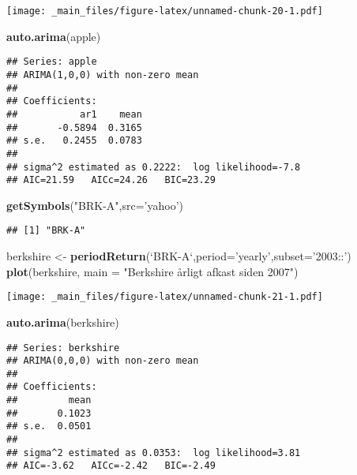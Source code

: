 \documentclass[]{book}
\newenvironment{Shaded}{\begin{snugshade}}{\end{snugshade}}
\newcommand{\DataTypeTok}[1]{\textcolor[rgb]{0.13,0.29,0.53}{#1}}
\newcommand{\KeywordTok}[1]{\textcolor[rgb]{0.13,0.29,0.53}{\textbf{#1}}}
\newcommand{\NormalTok}[1]{#1}
\newcommand{\StringTok}[1]{\textcolor[rgb]{0.31,0.60,0.02}{#1}}
\begin{document}
\texttt{[image: \_main\_files/figure-latex/unnamed-chunk-20-1.pdf]}

\begin{Shaded}
\begin{Highlighting}[]
\KeywordTok{auto.arima}\NormalTok{(apple)}
\end{Highlighting}
\end{Shaded}

\begin{verbatim}
## Series: apple 
## ARIMA(1,0,0) with non-zero mean 
## 
## Coefficients:
##           ar1    mean
##       -0.5894  0.3165
## s.e.   0.2455  0.0783
## 
## sigma^2 estimated as 0.2222:  log likelihood=-7.8
## AIC=21.59   AICc=24.26   BIC=23.29
\end{verbatim}

\begin{Shaded}
\begin{Highlighting}[]
\KeywordTok{getSymbols}\NormalTok{(}\StringTok{"BRK-A"}\NormalTok{,}\DataTypeTok{src=}\StringTok{'yahoo'}\NormalTok{)}
\end{Highlighting}
\end{Shaded}

\begin{verbatim}
## [1] "BRK-A"
\end{verbatim}

\begin{Shaded}
\begin{Highlighting}[]
\NormalTok{berkshire <-}\StringTok{ }\KeywordTok{periodReturn}\NormalTok{(}\StringTok{`}\DataTypeTok{BRK-A}\StringTok{`}\NormalTok{,}\DataTypeTok{period=}\StringTok{'yearly'}\NormalTok{,}\DataTypeTok{subset=}\StringTok{'2003::'}\NormalTok{)}
\KeywordTok{plot}\NormalTok{(berkshire, }\DataTypeTok{main =} \StringTok{"Berkshire årligt afkast siden 2007"}\NormalTok{)}
\end{Highlighting}
\end{Shaded}

\texttt{[image: \_main\_files/figure-latex/unnamed-chunk-21-1.pdf]}

\begin{Shaded}
\begin{Highlighting}[]
\KeywordTok{auto.arima}\NormalTok{(berkshire)}
\end{Highlighting}
\end{Shaded}

\begin{verbatim}
## Series: berkshire 
## ARIMA(0,0,0) with non-zero mean 
## 
## Coefficients:
##         mean
##       0.1023
## s.e.  0.0501
## 
## sigma^2 estimated as 0.0353:  log likelihood=3.81
## AIC=-3.62   AICc=-2.42   BIC=-2.49
\end{verbatim}
\end{document}
